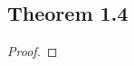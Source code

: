 \documentclass[../../main.tex]{subfiles}
\begin{document}
\subsection{Theorem 1.4}
\begin{wts}

\end{wts}
\begin{proof}

\end{proof}
\end{document}
